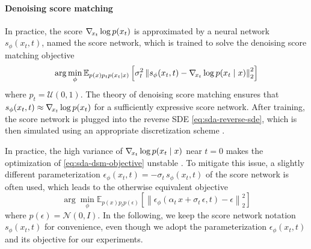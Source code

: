 \paragraph{Denoising score matching}
In practice, the score $\nabla_{\!{x_t}} \log p(x_t)$ is approximated by a neural network $s_\phi(x_t, t)$, named the score network, which is trained to solve the denoising score matching objective \cite{hyvarinen2005estimation, vincent2011connection, song2021scorebased}
\begin{equation} \label{eq:sda-dsm-objective}
    \arg\min_\phi \mathbb{E}_{p(x) p_t p(x_t \mid x)} \left[ \sigma_t^2 \left\| s_\phi(x_t, t) - \nabla_{\!{x_t}} \log p(x_t \mid x) \right\|_2^2 \right]
\end{equation}
where $p_t = \mathcal{U}(0, 1)$. The theory of denoising score matching ensures that $s_\phi(x_t, t) \approx \nabla_{\!{x_t}} \log p(x_t)$ for a sufficiently expressive score network. After training, the score network is plugged into the reverse SDE \eqref{eq:sda-reverse-sde}, which is then simulated using an appropriate discretization scheme \cite{song2021scorebased, song2021denoising, liu2022pseudo, zhang2023fast}.

In practice, the high variance of $\nabla_{\!{x_t}} \log p(x_t \mid x)$ near $t = 0$ makes the optimization of \eqref{eq:sda-dsm-objective} unstable \cite{zhang2023fast}. To mitigate this issue, a slightly different parameterization $\epsilon_\phi(x_t, t) = -\sigma_t \, s_\phi(x_t, t)$ of the score network is often used, which leads to the otherwise equivalent objective \cite{ho2020denoising, song2021denoising, zhang2023fast}
\begin{equation} \label{eq:sda-ddpm-objective}
    \arg\min_\phi \mathbb{E}_{p(x) p_t p(\epsilon)} \left[ \left\| \epsilon_\phi(\alpha_t \, x + \sigma_t \, \epsilon, t) - \epsilon\right\|_2^2 \right]
\end{equation}
where $p(\epsilon) = \mathcal{N}(0, I)$. In the following, we keep the score network notation $s_\phi(x_t, t)$ for convenience, even though we adopt the parameterization $\epsilon_\phi(x_t, t)$ and its objective for our experiments.

